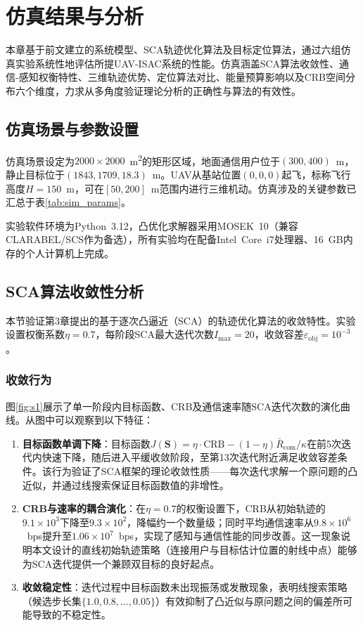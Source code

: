 \chapter{仿真结果与分析}

本章基于前文建立的系统模型、SCA轨迹优化算法及目标定位算法，通过六组仿真实验系统性地评估所提UAV-ISAC系统的性能。仿真涵盖SCA算法收敛性、通信-感知权衡特性、三维轨迹优势、定位算法对比、能量预算影响以及CRB空间分布六个维度，力求从多角度验证理论分析的正确性与算法的有效性。

\section{仿真场景与参数设置}

仿真场景设定为$2000\times2000$~m\textsuperscript{2}的矩形区域，地面通信用户位于$(300,400)$~m，静止目标位于$(1843,1709,18.3)$~m。UAV从基站位置$(0,0,0)$起飞，标称飞行高度$H=150$~m，可在$[50,200]$~m范围内进行三维机动。仿真涉及的关键参数已汇总于表\ref{tab:sim_params}。

实验软件环境为Python~3.12，凸优化求解器采用MOSEK~10（兼容CLARABEL/SCS作为备选），所有实验均在配备Intel~Core~i7处理器、16~GB内存的个人计算机上完成。

\section{SCA算法收敛性分析}

本节验证第3章提出的基于逐次凸逼近（SCA）的轨迹优化算法的收敛特性。实验设置权衡系数$\eta=0.7$，每阶段SCA最大迭代次数$I_{\max}=20$，收敛容差$\varepsilon_{\text{obj}}=10^{-3}$。

\subsection{收敛行为}

图\ref{fig:s1}展示了单一阶段内目标函数、CRB及通信速率随SCA迭代次数的演化曲线。从图中可以观察到以下特征：

\begin{enumerate}
\item \textbf{目标函数单调下降}：目标函数$J(\mathbf{S})=\eta\cdot\text{CRB}-(1-\eta)\bar{R}_{\text{com}}/\kappa$在前5次迭代内快速下降，随后进入平缓收敛阶段，至第13次迭代附近满足收敛容差条件。该行为验证了SCA框架的理论收敛性质——每次迭代求解一个原问题的凸近似，并通过线搜索保证目标函数值的非增性。

\item \textbf{CRB与速率的耦合演化}：在$\eta=0.7$的权衡设置下，CRB从初始轨迹的$9.1\times10^{3}$下降至$9.3\times10^{2}$，降幅约一个数量级；同时平均通信速率从$9.8\times10^{6}$~bps提升至$1.06\times10^{7}$~bps，实现了感知与通信性能的同步改善。这一现象说明本文设计的直线初始轨迹策略（连接用户与目标估计位置的射线中点）能够为SCA迭代提供一个兼顾双目标的良好起点。

\item \textbf{收敛稳定性}：迭代过程中目标函数未出现振荡或发散现象，表明线搜索策略（候选步长集$\{1.0,0.8,\dots,0.05\}$）有效抑制了凸近似与原问题之间的偏差所可能导致的不稳定性。
\end{enumerate}

